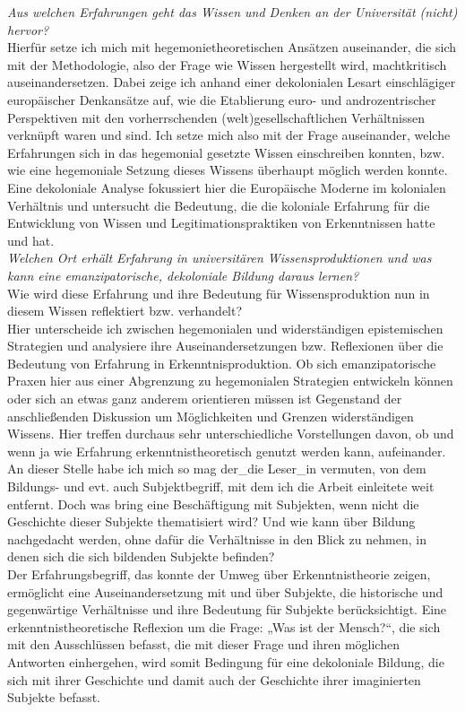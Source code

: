 \noindent\textit{Aus welchen Erfahrungen geht das Wissen und Denken an der Universität
(nicht) hervor?}\\ 
Hierfür setze ich mich mit hegemonietheoretischen Ansätzen
auseinander, die sich mit der Methodologie, also der Frage wie Wissen
hergestellt wird, machtkritisch auseinandersetzen. Dabei zeige ich anhand einer
dekolonialen Lesart einschlägiger europäischer Denkansätze auf, wie die
Etablierung euro- und androzentrischer Perspektiven mit den vorherrschenden
(welt)gesellschaftlichen Verhältnissen verknüpft waren und sind. Ich setze mich
also mit der Frage auseinander, welche Erfahrungen sich in das hegemonial
gesetzte Wissen einschreiben konnten, bzw. wie eine hegemoniale Setzung dieses
Wissens überhaupt möglich werden konnte. Eine dekoloniale Analyse fokussiert
hier die Europäische Moderne im kolonialen Verhältnis und untersucht die
Bedeutung, die die koloniale Erfahrung für die Entwicklung von Wissen und
Legitimationspraktiken von Erkenntnissen hatte und hat.\\[0.75em]
\textit{Welchen Ort erhält Erfahrung in universitären Wissensproduktionen und
was kann eine emanzipatorische, dekoloniale Bildung daraus lernen? }\\
Wie wird diese Erfahrung und ihre Bedeutung für Wissensproduktion nun in diesem
Wissen reflektiert bzw. verhandelt?\\ Hier unterscheide ich zwischen
hegemonialen und widerständigen epistemischen Strategien und analysiere ihre
Auseinandersetzungen bzw. Reflexionen über die Bedeutung von Erfahrung in
Erkenntnisproduktion. Ob sich emanzipatorische Praxen hier aus einer Abgrenzung
zu hegemonialen Strategien entwickeln können oder sich an etwas ganz anderem
orientieren müssen ist Gegenstand der anschließenden Diskussion um
Möglichkeiten und Grenzen widerständigen Wissens. Hier treffen durchaus sehr
unterschiedliche Vorstellungen davon, ob und wenn ja wie Erfahrung
erkenntnistheoretisch genutzt werden kann, aufeinander.\\

\noindent An dieser Stelle habe ich mich so mag der\_die Leser\_in vermuten, von dem
Bildungs- und evt. auch Subjektbegriff, mit dem ich die Arbeit einleitete weit
entfernt. Doch was bring eine Beschäftigung mit Subjekten, wenn nicht die
Geschichte dieser Subjekte thematisiert wird? Und wie kann über Bildung
nachgedacht werden, ohne dafür die Verhältnisse in den Blick zu nehmen, in
denen sich die sich bildenden Subjekte befinden?\\
Der Erfahrungsbegriff, das konnte der Umweg über Erkenntnistheorie zeigen,
ermöglicht eine Auseinandersetzung mit und über Subjekte, die historische und
gegenwärtige Verhältnisse und ihre Bedeutung für Subjekte berücksichtigt. Eine
erkenntnistheoretische Reflexion um die Frage: „Was ist der Mensch?“, die sich
mit den Ausschlüssen befasst, die mit dieser Frage und ihren möglichen
Antworten einhergehen, wird somit Bedingung für eine dekoloniale Bildung, die
sich mit ihrer Geschichte und damit auch der Geschichte ihrer imaginierten
Subjekte befasst.\\

